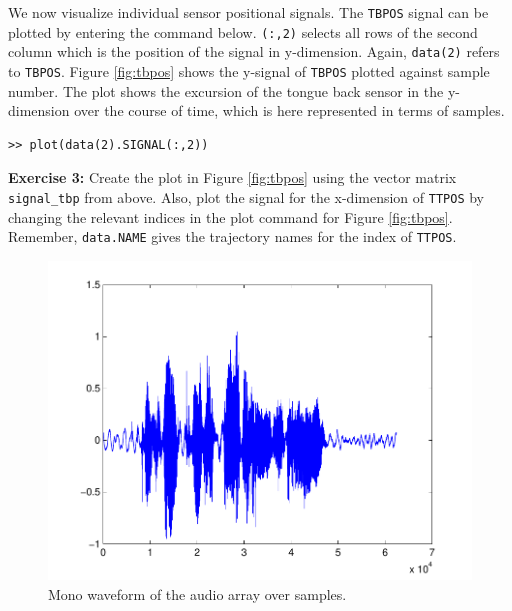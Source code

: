 \documentclass[a4paper, 12pt]{article}
\begin{document}
We now visualize individual sensor positional signals. The \texttt{TBPOS} signal can be plotted by entering the command below. \texttt{(:,2)} selects all rows of the second column which is the position of the signal in y-dimension. Again, \texttt{data(2)} refers to \texttt{TBPOS}. Figure \ref{fig:tbpos} shows the y-signal of \texttt{TBPOS} plotted against sample number. The plot shows the excursion of the tongue back sensor in the y-dimension over the course of time, which is here represented in terms of samples. %

\begin{verbatim}
>> plot(data(2).SIGNAL(:,2))
\end{verbatim}

\noindent \textbf{Exercise 3:} Create the plot in Figure \ref{fig:tbpos} using the vector matrix \texttt{signal\_tbp} from above. Also, plot the signal for the x-dimension of \texttt{TTPOS} by changing the relevant indices in the plot command for Figure \ref{fig:tbpos}. Remember, \texttt{data.NAME} gives the trajectory names for the index of \texttt{TTPOS}.\par\smallskip

\setlength\intextsep{-5pt}
\begin{figure}
\includegraphics[scale=0.45]{wave.pdf}%
\caption{Mono waveform of the audio array over samples.}\label{fig:wave}
\end{figure}
\end{document}

